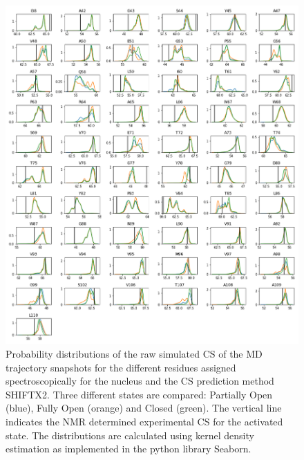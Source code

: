 \documentclass[%
 aip,
 amsmath,amssymb,
 preprint,%
]{revtex4-1}
\newcommand{\ca}{\ce{C_\alpha} }
\begin{document}
\begin{figure}[tbp]
	\includegraphics[width=\textwidth]{figures_SI/hist_shiftx2_CA.png}
	 \caption{\scriptsize
 Probability distributions of the raw simulated CS of the MD trajectory snapshots for the different residues assigned spectroscopically for the \ca nucleus and the CS prediction method SHIFTX2. Three different states are compared: Partially Open (blue), Fully Open (orange) and Closed (green). The vertical line indicates the NMR determined experimental CS for the activated state. The distributions are calculated using kernel density estimation as implemented in the python library Seaborn. 
}
\label{SI_hist1}
\end{figure}
\end{document}
